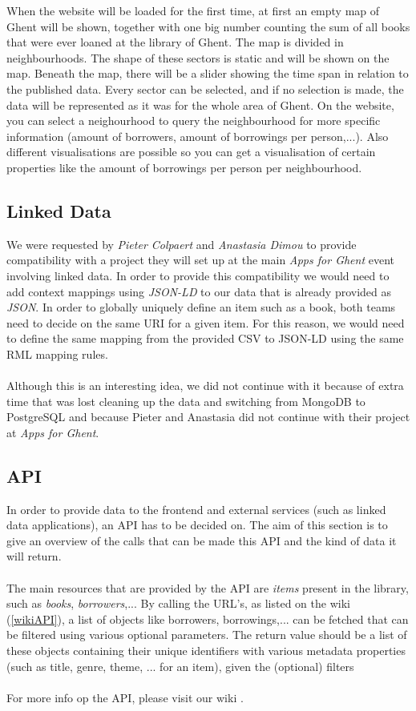 When the website will be loaded for the first time, at first an empty map of Ghent will be shown, together with one big number counting the sum of all books that were ever loaned at the library of Ghent. The map is divided in neighbourhoods. The shape of these sectors is static and will be shown on the map. Beneath the map, there will be a slider showing the time span in relation to the published data. Every sector can be selected, and if no selection is made, the data will be represented as it was for the whole area of Ghent.  On the website, you can select a neighourhood to query the neighbourhood for more specific information (amount of borrowers, amount of borrowings per person,...). Also different visualisations are possible so you can get a visualisation of certain properties like the amount of borrowings per person per neighbourhood.

\subsection{Linked Data}

We were requested by \emph{Pieter Colpaert} and \emph{Anastasia Dimou} to provide compatibility with a project they will set up at the main \emph{Apps for Ghent} event involving linked data. In order to provide this compatibility we would need to add context mappings using \emph{JSON-LD} to our data that is already provided as \emph{JSON}. In order to globally uniquely define an item such as a book, both teams need to decide on the same URI for a given item. For this reason, we would need to define the same mapping from the provided CSV to JSON-LD using the same RML mapping rules.\\
\\
Although this is an interesting idea, we did not continue with it because of extra time that was lost cleaning up the data and switching from MongoDB to PostgreSQL and because Pieter and Anastasia did not continue with their project at \emph{Apps for Ghent}.

\subsection{API}

In order to provide data to the frontend and external services (such as linked data applications), an API has to be decided on. The aim of this section is to give an overview of the calls that can be made this API and the kind of data it will return.\\
\\
The main resources that are provided by the API are \emph{items} present in the library, such as \emph{books}, \emph{borrowers},...
By calling the URL's, as listed on the wiki (\ref{wikiAPI}), a list of objects like borrowers, borrowings,... can be fetched that can be filtered using various optional parameters.
The return value should be a list of these objects containing their unique identifiers with various metadata properties (such as title, genre, theme, ... for an item), given the (optional) filters\\
\\
For more info op the API, please visit our wiki \cite{wiki}.

